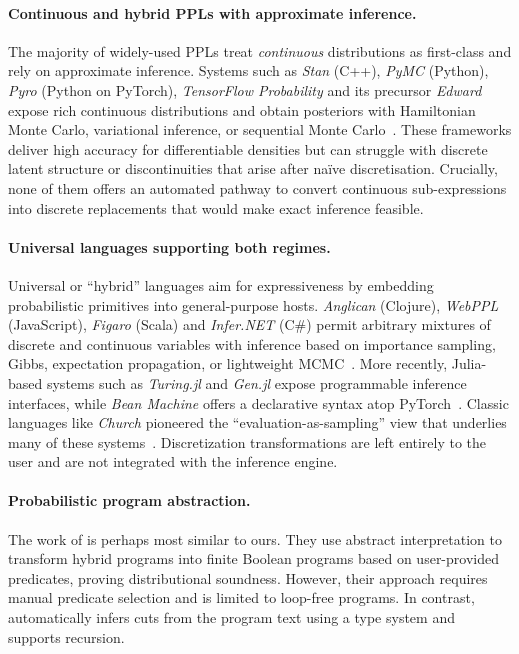 \paragraph{Continuous and hybrid PPLs with approximate inference.}  
The majority of widely-used PPLs treat \emph{continuous} distributions as first-class and rely on approximate inference. Systems such as \emph{Stan} (C++), \emph{PyMC} (Python), \emph{Pyro} (Python on PyTorch), \emph{TensorFlow Probability} and its precursor \emph{Edward} expose rich continuous distributions and obtain posteriors with Hamiltonian Monte Carlo, variational inference, or sequential Monte Carlo~\cite{Carpenter2017Stan,Salvatier2016PyMC3,Bingham2019Pyro,Dillon2017TFP,Tran2016Edward}. These frameworks deliver high accuracy for differentiable densities but can struggle with discrete latent structure or discontinuities that arise after naïve discretisation. Crucially, none of them offers an automated pathway to convert continuous sub-expressions into discrete replacements that would make exact inference feasible.

\paragraph{Universal languages supporting both regimes.}  
Universal or ``hybrid'' languages aim for expressiveness by embedding probabilistic primitives into general-purpose hosts. \emph{Anglican} (Clojure), \emph{WebPPL} (JavaScript), \emph{Figaro} (Scala) and \emph{Infer.NET} (C\#) permit arbitrary mixtures of discrete and continuous variables with inference based on importance sampling, Gibbs, expectation propagation, or lightweight MCMC~\cite{Tolpin2016Anglican,Goodman2014WebPPL,Pfeffer2009Figaro,Minka2018InferNET}. More recently, Julia-based systems such as \emph{Turing.jl} and \emph{Gen.jl} expose programmable inference interfaces, while \emph{Bean Machine} offers a declarative syntax atop PyTorch~\cite{Ge2018Turing,CusumanoTowner2019Gen,Tehrani2020BeanMachine}. Classic languages like \emph{Church} pioneered the ``evaluation-as-sampling'' view that underlies many of these systems~\cite{Goodman2008Church}. Discretization transformations are left entirely to the user and are not integrated with the inference engine.

\paragraph{Probabilistic program abstraction.}
The work of \cite{Holtzen2018Abstraction} is perhaps most similar to ours. They use abstract interpretation to transform hybrid programs into finite Boolean programs based on user-provided predicates, proving distributional soundness. However, their approach requires manual predicate selection and is limited to loop-free programs. In contrast, \Slice{} automatically infers cuts from the program text using a type system and supports recursion.

